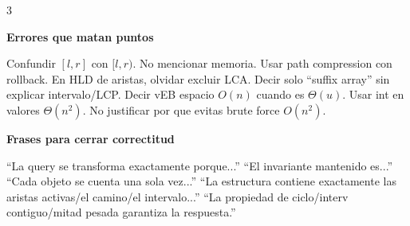\documentclass[8pt]{extarticle}
\newcommand{\blk}[2]{%
  \vspace{1.3pt}
  \noindent\colorbox{head}{\parbox{\linewidth-2\fboxsep}{\textbf{#1}}}\par
  {\footnotesize #2}\par
}
\begin{document}
\begin{multicols}{3}
\blk{Errores que matan puntos}{
Confundir \([l,r]\) con \([l,r)\). No mencionar memoria. Usar path compression con rollback. En HLD de aristas, olvidar excluir LCA. Decir solo ``suffix array'' sin explicar intervalo/LCP. Decir vEB espacio \(O(n)\) cuando es \(\Theta(u)\). Usar int en valores \(\Theta(n^2)\). No justificar por que evitas brute force \(O(n^2)\).}

\blk{Frases para cerrar correctitud}{
``La query se transforma exactamente porque...'' 
``El invariante mantenido es...''
``Cada objeto se cuenta una sola vez...''
``La estructura contiene exactamente las aristas activas/el camino/el intervalo...''
``La propiedad de ciclo/interv contiguo/mitad pesada garantiza la respuesta.''}

\end{multicols}
\end{document}
